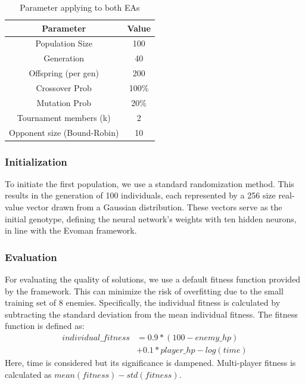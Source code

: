 \begin{table}
    \centering
    \caption{Parameter applying to both EAs}
    \label{tab:my_label}
    \begin{tabular}{@{}cc@{}}
     \hline %
        Parameter & Value \\ \hline
        Population Size & 100 \\
        Generation & 40 \\
        Offspring (per gen) & 200 \\
        Crossover Prob & 100\% \\
        Mutation Prob & 20\%  \\
        Tournament members (k) & 2 \\
        Opponent size (Bound-Robin) & 10 \\ \hline
    \end{tabular}
\end{table}



\subsubsection{Initialization}
To initiate the first population, we use a standard randomization method. This results in the generation of 100 individuals, each represented by a 256 size real-value vector drawn from a Gaussian distribution. These vectors serve as the initial genotype, defining the neural network's weights with ten hidden neurons, in line with the Evoman framework.

\subsubsection{Evaluation}
For evaluating the quality of solutions, we use a default fitness function provided by the framework. This can minimize the risk of overfitting due to the small training set of 8 enemies. Specifically, the individual fitness is calculated by subtracting the standard deviation from the mean individual fitness. The fitness function is defined as:
\begin{align*}
    individual\_fitness & = 0.9 * (100 - enemy\_hp)
    \\ &+ 0.1* player\_hp - log (time)
\end{align*}
Here, time is considered but its significance is dampened. Multi-player fitness is calculated as $mean(fitness)-std(fitness)$.

